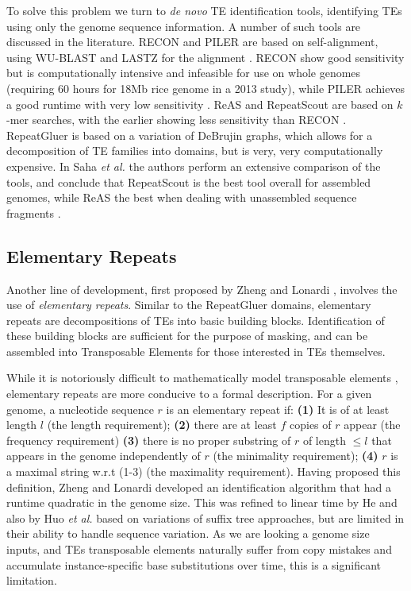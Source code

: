 \documentclass{bmcart}
\begin{document}
To solve this problem we turn to {\it de novo} TE identification
tools, identifying TEs using only the genome
sequence information.  A number of such tools are discussed in the
literature.   RECON and PILER are based on
self-alignment, using WU-BLAST and LASTZ for the alignment
\cite{Bao:2002,Edgar:2005p2365,Lopez:2003td,Harris:2007uf}.  RECON show good sensitivity but is
computationally intensive and infeasible for use on whole genomes
(requiring 60 hours for 18Mb rice genome in a 2013 study), while
PILER achieves a good runtime with very low sensitivity
\cite{Jiang:2013jt}.  ReAS \cite{Li:2005he} and RepeatScout
\cite{Price:2005p1247} are based on $k$-mer searches, with the
earlier showing less sensitivity than RECON \cite{Jiang:2013jt}.
RepeatGluer \cite{Pevzner:2004p3157,Zhi:2006p3199} is
based on a variation of DeBrujin graphs, which allows for a
decomposition of TE families into domains, but is very, very
computationally expensive.  In Saha {\it et al.} the authors perform
an extensive comparison of the tools, and conclude that RepeatScout is
the best tool overall for assembled genomes, while ReAS the best when
dealing with unassembled sequence fragments \cite{Saha:2008dm}.


\subsection*{Elementary Repeats}
Another line of development, first proposed by Zheng and Lonardi
\cite{Zheng:2005bl}, involves the use of {\it elementary repeats}.
Similar to the RepeatGluer domains, elementary repeats are
decompositions of TEs into basic building blocks.  Identification of
these building blocks are sufficient for the purpose
of masking, and can be assembled into Transposable Elements for those
interested in TEs themselves.

While it is notoriously difficult to mathematically model transposable
elements \cite{Bao:2002}, elementary repeats are more conducive to a
formal description.  For a given genome, a nucleotide sequence $r$ is
an elementary repeat if: {\bf (1)} It is of at least length $l$ (the
length requirement); {\bf (2)} there are at least $f$ copies of $r$
appear (the frequency requirement) {\bf (3)} there is no proper
substring of $r$ of length $\leq l$ that appears in the genome
independently of $r$ (the minimality requirement); {\bf (4)} $r$ is a
maximal string w.r.t (1-3) (the maximality requirement).  Having
proposed this definition, Zheng and Lonardi developed an
identification algorithm that had a runtime quadratic in the genome
size. This was refined to linear time by He and also by Huo {\it et
  al.}  \cite{He:2006gpa,Huo:2009hoa} based on variations of suffix
tree approaches, but are limited in their ability to handle sequence
variation.  As we are looking a genome size inputs, and TEs
transposable elements naturally suffer from copy mistakes and
accumulate instance-specific base substitutions over time, this is a
significant limitation.
\end{document}
